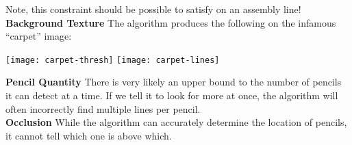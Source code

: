\documentclass{article}
\begin{document}
Note, this constraint should be possible to satisfy on an assembly line!\\

\textbf{Background Texture} The algorithm produces the following
on the infamous ``carpet'' image:

\begin{center}
  \texttt{[image: carpet-thresh]}
  \texttt{[image: carpet-lines]}
\end{center}

\textbf{Pencil Quantity} There is very likely an upper bound to the number
of pencils it can detect at a time. If we tell it to look for more at once,
the algorithm will often incorrectly find multiple lines per pencil.\\

\textbf{Occlusion} While the algorithm can accurately determine the location
of pencils, it cannot tell which one is above which.
\end{document}
